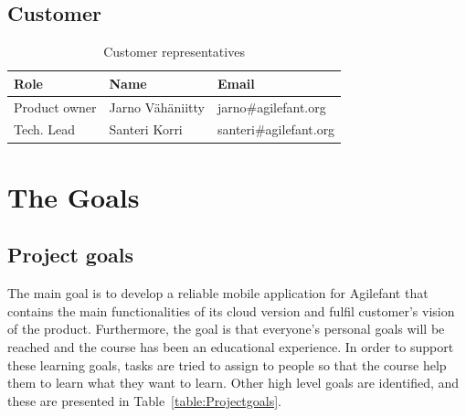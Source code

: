 \subsection{Customer}

\begin{table}[H]
\center
\begin{tabular}{|p{2cm}|p{3.8cm}|p{4.1cm}|} 
	
\hline 
\textbf{Role} & \textbf{Name} & \textbf{Email}\\ 
\hline
Product owner & Jarno Vähäniitty & jarno\#agilefant.org\\
\hline
Tech. Lead & Santeri Korri & santeri\#agilefant.org\\
\hline
\end{tabular} 
\caption{Customer representatives}
\label{table:Customer}
\end{table}



\section{The Goals}
\subsection{Project goals}

The main goal is to develop a reliable mobile application for Agilefant that
contains the main functionalities of its cloud version and fulfil customer's
vision of the product. Furthermore, the goal is that everyone's personal goals
will be reached and the course has been an educational experience. In order to
support these learning goals, tasks are tried to assign to people so that the
course help them to learn what they want to learn. Other high level goals are
identified, and these are presented in Table~\ref{table:Projectgoals}.

